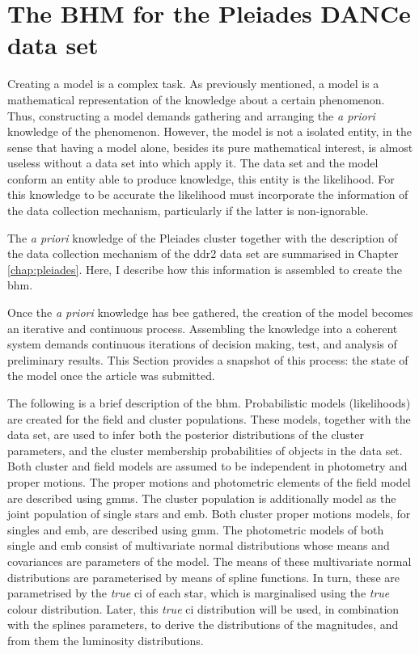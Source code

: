 \section{The BHM for the Pleiades DANCe data set}
\label{sect:datamodelling}
Creating a model is a complex task. As previously mentioned, a model is a mathematical representation of the knowledge about a certain phenomenon. Thus, constructing a model demands gathering and arranging the \emph{a priori} knowledge of the phenomenon. However, the model is not a isolated entity, in the sense that having a model alone, besides its pure mathematical interest, is almost useless without a data set into which apply it. The data set and the model conform an entity able to produce knowledge, this entity is the likelihood. For this knowledge to be accurate the likelihood must incorporate the information of the data collection mechanism, particularly if the latter is non-ignorable.

The \emph{a priori} knowledge of the Pleiades cluster together with the description of the data collection mechanism of the \gls{ddr2} data set are summarised in Chapter \ref{chap:pleiades}. Here, I describe how this information is assembled to create the \gls{bhm}.

Once the \emph{a priori} knowledge has bee gathered, the creation of the model becomes an iterative and continuous process. Assembling the knowledge into a coherent system demands continuous iterations of decision making, test, and analysis of preliminary results. This Section provides a snapshot of this process: the state of the model once the article \citet{Olivares2017} was submitted.

The following is a brief description of the \gls{bhm}. Probabilistic models (likelihoods) are created for the field and cluster populations. These models, together with the data set, are used to infer both the posterior distributions of the cluster parameters, and the cluster membership probabilities of objects in the data set. Both cluster and field models are assumed to be independent in photometry and proper motions. The proper motions and photometric elements of the field model are described using \glspl{gmm}. The cluster population is additionally model as the joint population of single stars and \gls{emb}. Both cluster proper motions models, for singles and \gls{emb}, are described using \gls{gmm}. The photometric models of both single and \gls{emb} consist of multivariate normal distributions whose means and covariances are parameters of the model. The means of these multivariate normal distributions are parameterised by means of spline functions. In turn, these are parametrised by the \emph{true} \gls{ci} of each star, which is marginalised using the \emph{true} colour distribution. Later, this \emph{true} \gls{ci} distribution will be used, in combination with the splines parameters, to derive the distributions of the magnitudes, and from them the luminosity distributions. 

